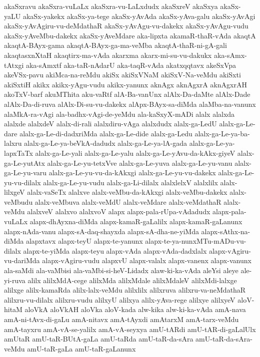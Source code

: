 {akaSxravu
akaSxra-vuLaLx
akaSxra-vu-LaLxdudx
akaSxreV
akaSxya
akaSx-yaLU
akaSx-yakekx
akaSx-ya-tege
akaSx-yAvAda
akaSx-yAva-galu
akaSx-yAvAgi
akaSx-yAvAgiru-vu-deMdathaR
akaSx-yAvAgu-vu-dakekx
akaSx-yAvAgu-vudu
akaSx-yAveMbu-dakekx
akaSx-yAveMdare
aka-lipxta
akamaR-thaR-vAda
akaqtA
akaqtA-BAyx-gama
akaqtA-BAyx-ga-ma-veMba
akaqtA-thaR-ni-gA-gali
akaqtasxnXtaH
akaqtirx-ma-vAda
akarxma
akarx-mi-su-vu-dakukx
aka-sAmx-tAtxgi
aka-sAmxtf
aka-taR-nAdarU
aka-taqR-vAda
akatxqqtavx
akeSxVpa
akeVSx-pavu
akiMca-na-reMdu
akiSx
akiSxVNaM
akiSxV-Na-veMdu
akiSxti
akiSxtiH
akikx
akikx-yAgu-vudu
akikx-yanunx
aknAgx
aknAgxrA
aknAgxrAH
akoTxV-barf
akuMThita
aku-vaRtf
alA-Ba-vanUnx
alAlx-Da-daMte
alAlx-Dade
alAlx-Da-di-ruva
alAlx-Di-su-vu-dakekx
alApx-BAyx-sa-diMda
alaMba-na-vanunx
alaMkA-ra-vAgi
ala-badhx-vAgi-de-yeMdu
ala-kaSxyX-mADi
alalx
alalxda
alalxde
alalxdeV
alalx-di-rali
alalxdiru-vAga
alalxdudx
alalx-ga-LedU
alalx-ga-Le-dare
alalx-ga-Le-di-dadxriMda
alalx-ga-Le-dide
alalx-ga-Ledu
alalx-ga-Le-ya-ba-lalxru
alalx-ga-Le-ya-beVkA-dadudx
alalx-ga-Le-ya-lA-gada
alalx-ga-Le-ya-lapxTaTx
alalx-ga-Le-yali
alalx-ga-Le-yalu
alalx-ga-Le-yAvu-da-kAkx-giyeV
alalx-ga-Le-yutAtx
alalx-ga-Le-yu-tetxVve
alalx-ga-Le-yuva
alalx-ga-Le-yu-vanu
alalx-ga-Le-yu-varu
alalx-ga-Le-yu-vu-da-kAkxgi
alalx-ga-Le-yu-vu-dakekx
alalx-ga-Le-yu-vu-dilalx
alalx-ga-Le-yu-vudu
alalx-ga-Li-dilalx
alalxlelxV
alalxlilx
alalx-lilxgeV
alalx-vaSeTx
alalxve
alalx-veMbu-da-kAkxgi
alalx-veMbu-dakekx
alalx-veMbudu
alalx-veMbuva
alalx-veMdU
alalx-veMdare
alalx-veMdathaR
alalx-veMdu
alalxveV
alalxvo
alalxvoV
alapx
alapx-pala-rUpa-vAdadudx
alapx-pala-vuLaLx
alapx-dhAyxna-diMda
alapx-kamaR-gaLalilx
alapx-kamaR-gaLanunx
alapx-nAda-vanu
alapx-sA-daq-shayxda
alapx-sA-dha-ne-yiMda
alapx-sAthx-na-diMda
alapxtavx
alapx-teyU
alapx-te-yanunx
alapx-te-ya-nunxMTu-mADu-vu-dilalx
alapx-te-yiMda
alapx-teyu
alapx-vAda
alapx-vAda-dadxlalx
alapx-vAgiru-vu-dariMda
alapx-vAgiru-vudu
alapxvU
alapx-valalx
alapx-vanenx
alapx-vanunx
ala-saMdi
ala-vaMbisi
ala-vaMbi-si-heV-Lidadx
alaw-ki-ka-vAda
aleYsi
aleye
ale-yi-ruva
alilx
alilxMdA-cege
alilxMda
alilxMdale
alilxMdaleV
alilxMdi-lalxge
alilxge
alilx-kamaRda
alilx-lalx-veMdu
alilxlilx
alilxruva
alilxru-va-neMdathaR
alilxru-vu-dilalx
alilxru-vudu
alilxyU
alilxya
alilx-yAva-rege
alilxye
alilxyeV
aloV-hitaM
aloVkA
aloVkAH
aloVka
aloV-kada
alw-kika
alw-ki-ka-vAda
amA-nava
amA-ni-tAvx-di-gaLu
amA-nitavx
amA-tAyxdi
amAtarxM
amA-tarx-veMdu
amA-tayxru
amA-vA-se-yalilx
amA-vA-seyxya
amU-tARdi
amU-tAR-di-gaLalUlx
amUtaR
amU-taR-BUtA-gaLa
amU-taRda
amU-taR-da-sAra
amU-taR-da-sAra-veMdu
amU-taR-gaLa
amU-taR-gaLanunx
}
